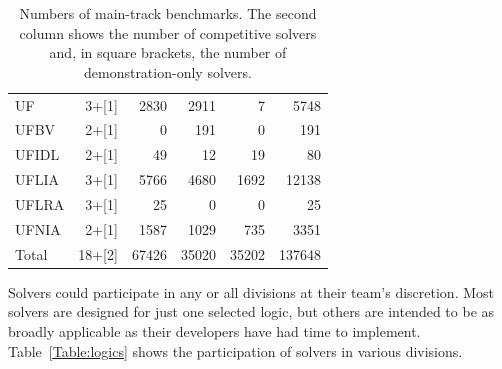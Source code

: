 \documentclass[twoside,11pt]{article}
\begin{document}
\begin{table}
\begin{tabular}{|l|r|r|r|r|r|}
UF & 3+[1] & 2830 & 2911 & 7 & 5748 \\
UFBV & 2+[1] & 0 & 191 & 0 & 191 \\
UFIDL & 2+[1] & 49 & 12 & 19 & 80 \\
UFLIA & 3+[1] & 5766 & 4680 & 1692 & 12138 \\
UFLRA & 3+[1] & 25 & 0 & 0 & 25\\
UFNIA & 2+[1] & 1587 & 1029 & 735 & 3351 \\
\hline
Total & 18+[2] & 67426 & 35020 & 35202 & 137648 \\
\hline
\end{tabular}
\vspace{.2in}
\caption{Numbers of main-track benchmarks. The second column shows the number of competitive solvers and, in square brackets, the number of demonstration-only solvers.}
\label{Table:benchmarks}
\end{table}


Solvers could participate in any or all divisions at their team's discretion. Most solvers are designed for just one selected logic, but others are intended to be as broadly applicable as their developers have had time to implement. Table~\ref{Table:logics} shows the participation of solvers in various divisions.
\end{document}
